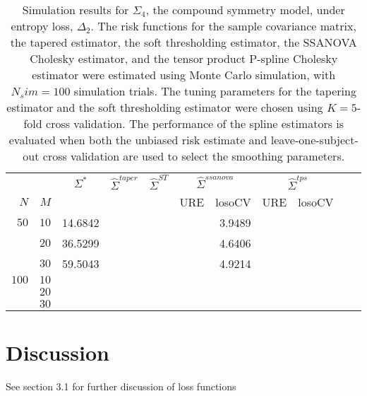 \documentclass[12pt]{article}
\newcommand{\ra}[1]{\renewcommand{\arraystretch}{#1}}
\theoremstyle{definition}
\begin{document}
\begin{table}\centering
\ra{1.3}
\caption{Simulation results for $\Sigma_4$, the compound symmetry model,  under entropy loss, $\Delta_2$. The risk functions for the sample covariance matrix, the tapered estimator, the soft thresholding estimator, the SSANOVA Cholesky estimator, and the tensor product P-spline Cholesky estimator were estimated using Monte Carlo simulation, with $N_sim = 100$ simulation trials. The tuning parameters for the tapering estimator and the soft thresholding estimator were chosen using $K = 5$-fold cross validation. The performance of the spline estimators is evaluated when both the unbiased risk estimate and leave-one-subject-out cross validation are used to select the smoothing parameters.}
\begin{tabular}{@{}rrrcrcrrcrr@{}}\toprule
   &            & \multicolumn{1}{c}{$\Sigma^*$}  & \multicolumn{1}{c}{$\hat{\Sigma}^{taper}$} &\multicolumn{1}{c}{$\hat{\Sigma}^{ST}$} &\multicolumn{2}{c}{ $\hat{\Sigma}^{ssanova}$} &  \multicolumn{2}{c}{ $\hat{\Sigma}^{tps}$}\\
$N$ & $M$ 	&	  &	& & \multicolumn{1}{c}{\mbox{URE}} & \multicolumn{1}{c}{\mbox{losoCV}} &\multicolumn{1}{c}{\mbox{URE}} & \multicolumn{1}{c}{\mbox{losoCV}}\\ \midrule
$50$ & $10$ &	14.6842  &&&&	3.9489	&&\\
  & $20$  &    36.5299	&&&&  4.6406	&&\\
  & $30$   &    59.5043	&&&&  4.9214	&&\\
$100$ & $10$ &&&&&&&\\
& $20$  &&&&&&& \\
& $30$  &&&&&&& \\
\bottomrule
\end{tabular}
\end{table}

\section{Discussion}

See \citet{pourahmadi2011covariance} section 3.1 for further discussion of loss functions
\end{document}
